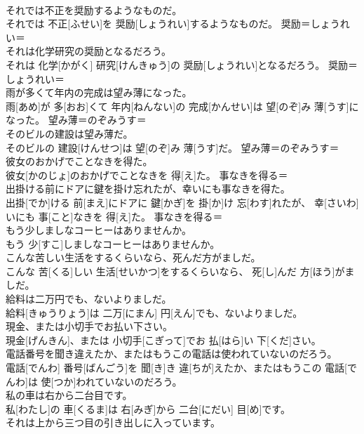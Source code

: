 \documentclass[8pt]{extreport}
\begin{document}
\begin{CJK}{UTF8}{min}
\\	それでは不正を奨励するようなものだ。	
\\	それでは 不正[ふせい]を 奨励[しょうれい]するようなものだ。	奨励＝しょうれい＝ 
\\	それは化学研究の奨励となるだろう。	
\\	それは 化学[かがく] 研究[けんきゅう]の 奨励[しょうれい]となるだろう。	奨励＝しょうれい＝ 
\\	雨が多くて年内の完成は望み薄になった。	
\\	雨[あめ]が 多[おお]くて 年内[ねんない]の 完成[かんせい]は 望[のぞ]み 薄[うす]になった。	望み薄＝のぞみうす＝ 
\\	そのビルの建設は望み薄だ。	
\\	そのビルの 建設[けんせつ]は 望[のぞ]み 薄[うす]だ。	望み薄＝のぞみうす＝ 
\\	彼女のおかげでことなきを得た。	
\\	彼女[かのじょ]のおかげでことなきを 得[え]た。	事なきを得る＝ 
\\	出掛ける前にドアに鍵を掛け忘れたが、幸いにも事なきを得た。	
\\	出掛[でか]ける 前[まえ]にドアに 鍵[かぎ]を 掛[か]け 忘[わす]れたが、 幸[さいわ]いにも 事[こと]なきを 得[え]た。	事なきを得る＝ 
\\	もう少しましなコーヒーはありませんか。	
\\	もう 少[すこ]しましなコーヒーはありませんか。	
\\	こんな苦しい生活をするくらいなら、死んだ方がましだ。	
\\	こんな 苦[くる]しい 生活[せいかつ]をするくらいなら、 死[し]んだ 方[ほう]がましだ。	
\\	給料は二万円でも、ないよりましだ。	
\\	給料[きゅうりょう]は 二万[にまん] 円[えん]でも、ないよりましだ。	
\\	現金、または小切手でお払い下さい。	
\\	現金[げんきん]、または 小切手[こぎって]でお 払[はら]い 下[くだ]さい。	
\\	電話番号を聞き違えたか、またはもうこの電話は使われていないのだろう。	
\\	電話[でんわ] 番号[ばんごう]を 聞[き]き 違[ちが]えたか、またはもうこの 電話[でんわ]は 使[つか]われていないのだろう。	
\\	私の車は右から二台目です。	
\\	私[わたし]の 車[くるま]は 右[みぎ]から 二台[にだい] 目[め]です。	
\\	それは上から三つ目の引き出しに入っています。	

\end{CJK}
\end{document}
